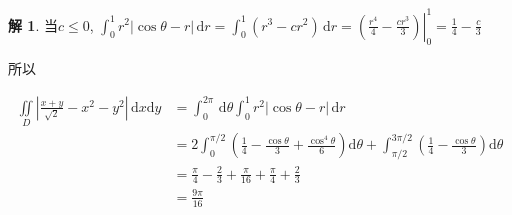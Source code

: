 \documentclass[a4paper,12pt]{article}
\theoremstyle{definition}
\newtheorem*{sol}{解}
\begin{document}
\begin{sol}
    当$c\leq 0$, $\int_0^1 r^2|\cos\theta-r|\,\mathrm{d}r= \int_0^1 (r^3 - c r^2)\,\mathrm{d}r = \left.\left( \frac{r^4}{4} - \frac{c r^3}{3} \right)\right|_0^1 = \frac14 - \frac{c}{3}$

    所以

    \begin{align*}
        \iint\limits_{D} \left| \frac{x + y}{\sqrt{2}} - x^2 - y^2 \right| \, \mathrm{d}x\mathrm{d}y
         & =\int_0^{2\pi}\,\mathrm{d}\theta\int_0^1 r^2\left|\cos\theta - r\right|\,\mathrm{d}r                                                                                                           \\
         & =2\int_0^{\pi/2} \left( \frac14 - \frac{\cos\theta}{3} + \frac{\cos^4\theta}{6} \right) \mathrm{d}\theta+ \int_{\pi/2}^{3\pi/2} \left( \frac14 - \frac{\cos\theta}{3} \right) \mathrm{d}\theta \\
         & =\frac{\pi}{4} - \frac{2}{3} + \frac{\pi}{16}+\frac{\pi}{4} + \frac{2}{3}                                                                                                                      \\
         & =\frac{9\pi}{16}
    \end{align*}
\end{sol}
\end{document}
